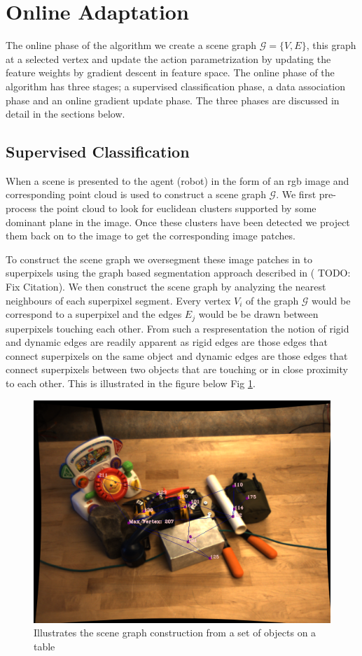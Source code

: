 \section{Online Adaptation}
\label{sec:hyp_test}
The online phase of the algorithm we create a scene graph $\mathcal{G} = \{V,E\}$, this graph at a selected vertex and update the action parametrization by updating the feature weights by gradient descent in feature space. The online phase of the algorithm has three stages; a supervised classification phase, a data association phase and an online gradient update phase. The three phases are discussed in detail in the sections below.
\subsection{Supervised Classification}
When a scene is presented to the agent (robot) in the form of an rgb image and corresponding point cloud is used to construct a scene graph $\mathcal{G}$. We first pre-process the point cloud to look for euclidean clusters supported by some dominant plane in the image. Once these clusters have been detected we project them back on to the image to get the corresponding image patches.

To construct the scene graph we oversegment these image patches in to superpixels using the graph based segmentation approach described in (\cite{Javidi12_Journal} TODO: Fix Citation). We then construct the scene graph by analyzing the nearest neighbours of each superpixel segment. Every vertex $V_i$ of the graph $\mathcal{G}$ would be correspond to a superpixel and the edges $E_j$ would be be drawn between superpixels touching each other. From such a respresentation the notion of rigid and dynamic edges are readily apparent as rigid edges are those edges that connect superpixels on the same object and dynamic edges are those edges that connect superpixels between two objects that are touching or in close proximity to each other. This is illustrated in the figure below Fig \ref{fig:scene_graph}.

\begin{figure}[ht!]
	\centering
	\includegraphics[width=\linewidth]{figs/full_graph.png}
	\caption{Illustrates the scene graph construction from a set of objects on a table}
	\label{fig:scene_graph}
\end{figure}

